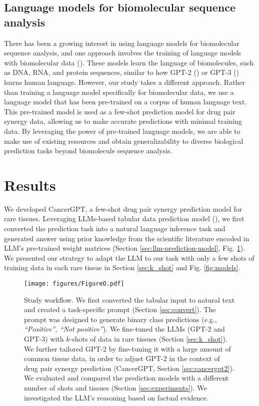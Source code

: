 \subsection{Language models for biomolecular sequence analysis}
There has been a growing interest in using language models for biomolecular sequence analysis, and one approach involves the training of language models with biomolecular data (\cite{Madani2023-sp, nvidia_bionemo}). These models learn the language of biomolecules, such as DNA, RNA, and protein sequences, similar to how GPT-2 (\cite{radford_language_nodate}) or GPT-3 (\cite{brown_language_2020}) learns human language. However, our study takes a different approach. Rather than training a language model specifically for biomolecular data, we use a  language model that has been pre-trained on a corpus of human language text. This pre-trained model is used as a few-shot prediction model for drug pair synergy data, allowing us to make accurate predictions with minimal training data.  By leveraging the power of pre-trained language models, we are able to make use of existing resources and obtain generalizability to diverse biological prediction tasks beyond biomolecule sequence analysis.  

\section{Results}

We developed CancerGPT, a few-shot drug pair synergy prediction model for rare tissues. Leveraging LLMs-based tabular data prediction model (\cite{hegselmann_tabllm_2023}), we first converted the prediction task into a natural language inference task and generated answer using prior knowledge from the scientific literature encoded in LLM's pre-trained weight matrices (Section \ref{sec:llm-prediction-model}, Fig. \ref{fig:study_workflow}). We presented our strategy to adapt the LLM to our task with only a few shots of training data in each rare tissue in Section \ref{sec:k_shot} and Fig. \ref{fig:models}.

\begin{figure}[t]
  \centering 
  \texttt{[image: figures/FigureO.pdf]}
  \caption{Study workflow. We first converted the tabular input to natural text and created a task-specific prompt (Section \ref{sec:convert}). The prompt was designed to generate binary class predictions (e.g., \emph{``Positive'', ``Not positive''}). We fine-tuned the LLMs (GPT-2 and GPT-3) with $k$-shots of data in rare tissues (Section \ref{sec:k_shot}). We further tailored GPT-2 by fine-tuning it with a large amount of common tissue data, in order to adjust GPT-2 in the context of drug pair synergy prediction (CancerGPT, Section \ref{sec:cancergpt2}). We evaluated and compared the prediction models with a different number of shots and tissues (Section \ref{sec:experiments}). We investigated the LLM's reasoning based on factual evidence.}  
  \label{fig:study_workflow} 
\end{figure}

